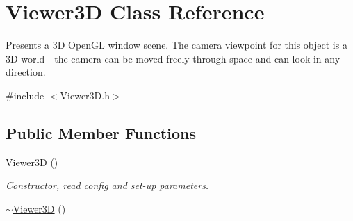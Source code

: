 \hypertarget{class_viewer3_d}{
\section{Viewer3D Class Reference}
\label{class_viewer3_d}
}


Presents a 3D OpenGL window scene. The camera viewpoint for this object is a 3D world -\/ the camera can be moved freely through space and can look in any direction.  




{\ttfamily \#include $<$Viewer3D.h$>$}

\subsection*{Public Member Functions}
\begin{DoxyCompactItemize}
\item 
\hyperlink{class_viewer3_d_aa46cf0bb42f2f2043c300b265fadfeb6}{Viewer3D} ()
\begin{DoxyCompactList}\small\item\em Constructor, read config and set-\/up parameters. \end{DoxyCompactList}\item 
\hypertarget{class_viewer3_d_a20f7ca0ff671bbd33095fcadf589ae51}{
\hyperlink{class_viewer3_d_a20f7ca0ff671bbd33095fcadf589ae51}{$\sim$Viewer3D} ()}
\label{class_viewer3_d_a20f7ca0ff671bbd33095fcadf589ae51}


\end{DoxyCompactItemize}
